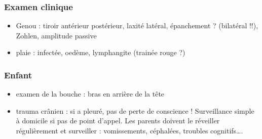 \documentclass[11pt]{article}
\begin{document}
\subsubsection{Examen clinique}
\label{sec:org5540206}
\begin{itemize}
\item Genou : tiroir antérieur postérieur, laxité latéral, épanchement ? (bilatéral !!), Zohlen, amplitude passive
\item plaie : infectée, oedème, lymphangite (trainée rouge ?)
\end{itemize}
\subsubsection{Enfant}
\label{sec:org7b2be8f}
\begin{itemize}
\item examen de la bouche : bras en arrière de la tête
\item trauma crânien : si a pleuré, pas de perte de conscience !
Surveillance simple à domicile si pas de point d'appel. Les parents
doivent le réveiller régulièrement et surveiller : vomissements,
céphalées, troubles cognitifs\ldots{}.
\end{itemize}
\end{document}
